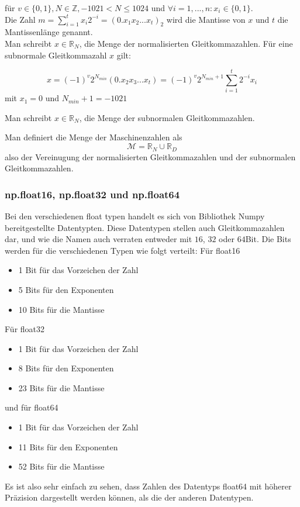 \documentclass{scrartcl}
\begin{document}
\begin{flushleft}
für \(v \in \{0, 1\}, N \in \mathbb{Z}, -1021 < N \leqslant 1024\) und \(\forall i = 1,...,n: x_i \in \{0, 1\} \). \\
Die Zahl \( m =  \sum_{i=1}^{t}x_i 2^{-i} = (0.x_1x_2...x_t)_2 \) wird die Mantisse von \(x\) und \(t\) die Mantissenlänge genannt.        \\ 
Man schreibt \(x \in \mathbb{R}_N \), die Menge der normalisierten Gleitkommazahlen. 
Für eine subnormale Gleitkommazahl \(x\) gilt:                                                   %
\end{flushleft}
\[x = (-1)^v 2^{N_{min}} (0.x_2x_3...x_t) = (-1)^v 2^{N_{min}+1} \sum_{i=1}^{t} 2^{-i}x_i \]
mit \(x_1 = 0\) und \(N_{min} + 1 = -1021 \)
\begin{flushleft}
  Man schreibt \(x \in \mathbb{R}_N \), die Menge der subnormalen Gleitkommazahlen.                              %
 
  Man definiert die Menge der Maschinenzahlen als 
\[\mathcal{M} = \mathbb{R}_N \cup \mathbb{R}_D \]
also der Vereinugung der normalisierten Gleitkommazahlen und der subnormalen Gleitkommazahlen.                    %
\end{flushleft}

\subsubsection{np.float16, np.float32 und np.float64}
Bei den verschiedenen float typen handelt es sich von Bibliothek Numpy bereitgestellte Datentypten.
Diese Datentypen stellen auch Gleitkommazahlen dar, und wie die Namen auch verraten entweder mit \(16\), \(32\) oder \(64\)Bit.
Die Bits werden für die verschiedenen Typen wie folgt verteilt:
Für float16
\begin{itemize}
  \item 1 Bit für das Vorzeichen der Zahl                                                               %
  \item 5 Bits für den Exponenten
  \item 10 Bits für die Mantisse
\end{itemize}
Für float32
\begin{itemize}
  \item 1 Bit für das Vorzeichen der Zahl                                                                 %
  \item 8 Bits für den Exponenten
  \item 23 Bits für die Mantisse
\end{itemize}
und für float64 
\begin{itemize}
  \item 1 Bit für das Vorzeichen der Zahl
  \item 11 Bits für den Exponenten
  \item 52 Bits für die Mantisse
\end{itemize}
Es ist also sehr einfach zu sehen, dass Zahlen des Datentyps float64 mit höherer Präzision dargestellt werden können, als die
der anderen Datentypen.
\end{document}
